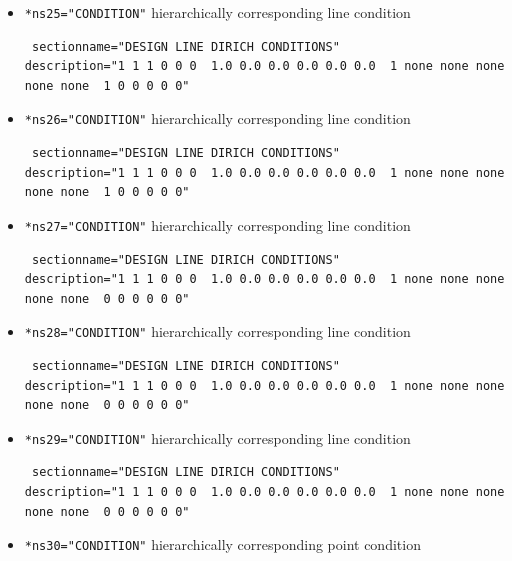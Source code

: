 \begin{itemize}
\begin{small}
\begin{verbatim}
\end{verbatim} \end{small} \item \verb|*ns25="CONDITION"| \qquad hierarchically corresponding line condition
\begin{small} \begin{verbatim} sectionname="DESIGN LINE DIRICH CONDITIONS"
description="1 1 1 0 0 0  1.0 0.0 0.0 0.0 0.0 0.0  1 none none none none none  1 0 0 0 0 0"
\end{verbatim} \end{small} \item \verb|*ns26="CONDITION"| \qquad hierarchically corresponding line condition
\begin{small} \begin{verbatim} sectionname="DESIGN LINE DIRICH CONDITIONS"
description="1 1 1 0 0 0  1.0 0.0 0.0 0.0 0.0 0.0  1 none none none none none  1 0 0 0 0 0"
\end{verbatim} \end{small} \item \verb|*ns27="CONDITION"| \qquad hierarchically corresponding line condition
\begin{small} \begin{verbatim} sectionname="DESIGN LINE DIRICH CONDITIONS"
description="1 1 1 0 0 0  1.0 0.0 0.0 0.0 0.0 0.0  1 none none none none none  0 0 0 0 0 0"
\end{verbatim} \end{small} \item \verb|*ns28="CONDITION"| \qquad hierarchically corresponding line condition
\begin{small} \begin{verbatim} sectionname="DESIGN LINE DIRICH CONDITIONS"
description="1 1 1 0 0 0  1.0 0.0 0.0 0.0 0.0 0.0  1 none none none none none  0 0 0 0 0 0"
\end{verbatim} \end{small} \item \verb|*ns29="CONDITION"| \qquad hierarchically corresponding line condition
\begin{small} \begin{verbatim} sectionname="DESIGN LINE DIRICH CONDITIONS"
description="1 1 1 0 0 0  1.0 0.0 0.0 0.0 0.0 0.0  1 none none none none none  0 0 0 0 0 0"
\end{verbatim} \end{small} \item \verb|*ns30="CONDITION"| \qquad hierarchically corresponding point condition

\end{itemize}
